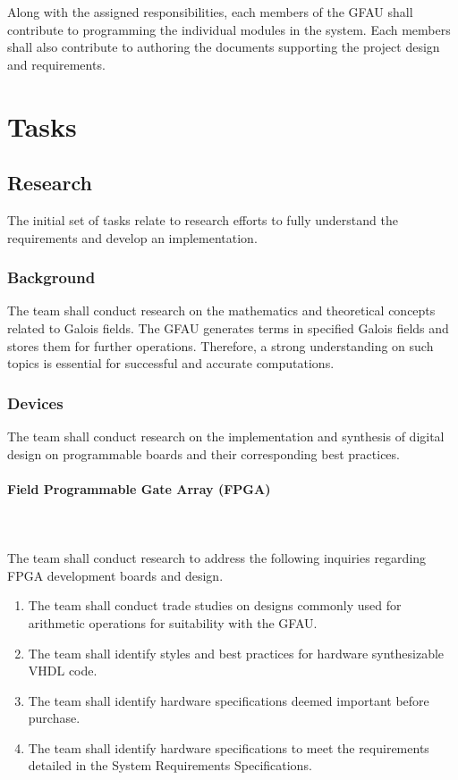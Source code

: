 \documentclass[12pt]{extarticle}
\begin{document}
    Along with the assigned responsibilities, each members of the GFAU shall
    contribute to programming the individual modules in the system. Each
    members shall also contribute to authoring the documents supporting the
    project design and requirements.

    \section{Tasks}

        \subsection{Research} The initial set of tasks relate to research
        efforts to fully understand the requirements and develop an
        implementation.

            \subsubsection{Background} The team shall conduct research on the
            mathematics and theoretical concepts related to Galois fields. The
            GFAU generates terms in specified Galois fields and stores them for
            further operations. Therefore, a strong understanding on such
            topics is essential for successful and accurate computations.

            \subsubsection{Devices} The team shall conduct research on the
            implementation and synthesis of digital design on programmable
            boards and their corresponding best practices.
            
                \paragraph{Field Programmable Gate Array (FPGA)} \leavevmode
                \\~\\ The team shall conduct research to address the following
                inquiries regarding FPGA development boards and design.
                \begin{enumerate}
                    \item The team shall conduct trade studies on designs
                    commonly used for arithmetic operations for suitability
                    with the GFAU.
                    \item The team shall identify styles and best practices for
                    hardware synthesizable VHDL code.
                    \item The team shall identify hardware specifications
                    deemed important before purchase.
                    \item The team shall identify hardware specifications to
                    meet the requirements detailed in the System Requirements
                    Specifications.
                \end{enumerate}
\end{document}
